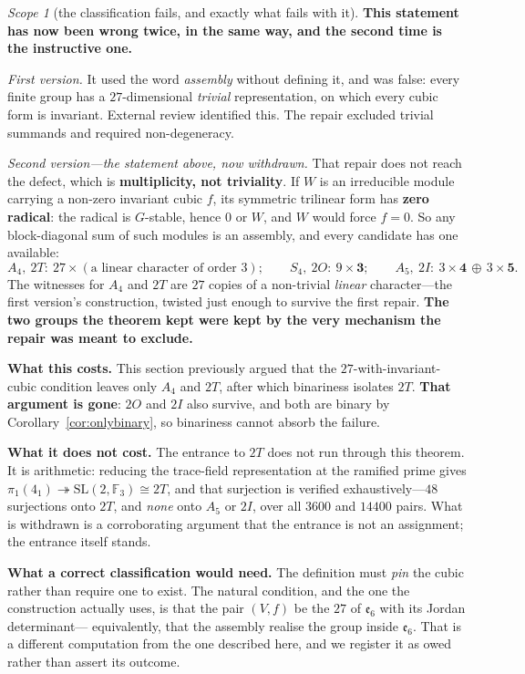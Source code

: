 \documentclass[11pt,reqno]{amsart}
\theoremstyle{plain}
\theoremstyle{definition}
\theoremstyle{remark}
\newtheorem{scope}[theorem]{Scope}
\newcommand{\F}{\mathbb{F}}
\newcommand{\SL}{\mathrm{SL}}
\newcommand{\ee}{\mathfrak{e}}
\begin{document}
\begin{scope}[the classification fails, and exactly what fails with it]\label{sc:assembly}
\textbf{This statement has now been wrong twice, in the same way, and the second time is the
instructive one.}

\emph{First version.} It used the word \emph{assembly} without defining it, and was false:
every finite group has a $27$-dimensional \emph{trivial} representation, on which every cubic
form is invariant. External review identified this. The repair excluded trivial summands and
required non-degeneracy.

\emph{Second version---the statement above, now withdrawn.} That repair does not reach the
defect, which is \textbf{multiplicity, not triviality}. If $W$ is an irreducible module
carrying a non-zero invariant cubic $f$, its symmetric trilinear form has \textbf{zero
radical}: the radical is $G$-stable, hence $0$ or $W$, and $W$ would force $f=0$. So any
block-diagonal sum of such modules is an assembly, and every candidate has one available:
\[
  A_4,\ 2T:\ 27\times(\text{a linear character of order }3);\qquad
  S_4,\ 2O:\ 9\times\mathbf{3};\qquad
  A_5,\ 2I:\ 3\times\mathbf{4}\,\oplus\,3\times\mathbf{5}.
\]
The witnesses for $A_4$ and $2T$ are $27$ copies of a non-trivial \emph{linear} character---the
first version's construction, twisted just enough to survive the first repair. \textbf{The two
groups the theorem kept were kept by the very mechanism the repair was meant to exclude.}

\textbf{What this costs.} This section previously argued that the $27$-with-invariant-cubic
condition leaves only $A_4$ and $2T$, after which binariness isolates $2T$. \textbf{That
argument is gone}: $2O$ and $2I$ also survive, and both are binary by
Corollary~\ref{cor:onlybinary}, so binariness cannot absorb the failure.

\textbf{What it does not cost.} The entrance to $2T$ does not run through this theorem. It is
arithmetic: reducing the trace-field representation at the ramified prime gives
$\pi_1(4_1)\twoheadrightarrow\SL(2,\F_3)\cong2T$, and that surjection is verified
exhaustively---$48$ surjections onto $2T$, and \emph{none} onto $A_5$ or $2I$, over all $3600$
and $14400$ pairs. What is withdrawn is a corroborating argument that the entrance is not an
assignment; the entrance itself stands.

\textbf{What a correct classification would need.} The definition must \emph{pin} the cubic
rather than require one to exist. The natural condition, and the one the construction actually
uses, is that the pair $(V,f)$ be the $27$ of $\ee_6$ with its Jordan determinant---
equivalently, that the assembly realise the group inside $\ee_6$. That is a different
computation from the one described here, and we register it as owed rather than assert its
outcome.
\end{scope}
\end{document}
